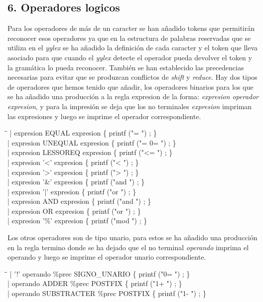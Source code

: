 \documentclass[11pt,spanish]{article}
\begin{document}
		\subsection*{6. Operadores logicos}
		\label{subsec:6}
		Para los operadores de más de un caracter se han añadido tokens que permitirán reconocer esos operadores ya que en la estructura de palabras reservadas que se utiliza en el \textit {yylex} se ha añadido la definición de cada caracter y el token que lleva asociado para que cuando el \textit {yylex} detecte el operador pueda devolver el token y la gramática lo pueda reconocer. También se han establecido las precedencias necesarias para evitar que se produzcan conflictos de \textit {shift} y \textit {reduce}. Hay dos tipos de operadores que hemos tenido que añadir, los operadores binarios para los que se ha añadido una producción a la regla {\ttfamily expresion} de la forma: \textit {expresion operador expresion}, y para la impresión se deja que los no terminales \textit {expresion} impriman las expresiones y luego se imprime el operador correspondiente.
		\begin{tcolorbox}
		\begin{tabbing}
			\hspace*{1cm}\= \hspace*{6cm}\=\kill
			| expresion  EQUAL expresion\> \>		\{ printf  ("= ") ; \}\\
			| expresion  UNEQUAL expresion\> \>		\{ printf  ("= 0= ") ; \}\\
			| expresion  LESSOREQ expresion\> \>	\{ printf  ("<= ") ; \}\\
			| expresion  '<' expresion\> \>			\{ printf  ("< ") ; \}\\
			| expresion  '>' expresion\> \>			\{ printf  ("> ") ; \}\\
			| expresion  '\&' expresion\> \>			\{ printf  ("and ") ; \}\\
			| expresion  '|' expresion\> \>			\{ printf  ("or ") ; \}\\
			| expresion  AND expresion\> \>			\{ printf  ("and ") ; \}\\
			| expresion  OR expresion\> \>			\{ printf  ("or ") ; \}\\
			| expresion  '\%' expresion\> \>			\{ printf  ("mod ") ; \}
		\end{tabbing}
		\end{tcolorbox}
		Los otros operadores son de tipo unario, para estos se ha añadido una producción en la regla {\ttfamily termino} donde se ha dejado que el no terminal \textit {operando} imprima el operando y luego se imprime el operador unario correspondiente.
		\begin{tcolorbox}
		\begin{tabbing}
			\hspace*{1cm}\= \hspace*{8cm}\=\kill
			| '!' operando \%prec SIGNO\_UNARIO\> \>  \{ printf ("0= ") ; \}\\
			| operando ADDER \%prec POSTFIX\> \>  \{ printf ("1+ ") ; \}\\
			| operando SUBSTRACTER \%prec POSTFIX\> \> \{ printf ("1- ") ; \}
		\end{tabbing}
		\end{tcolorbox}
\end{document}
